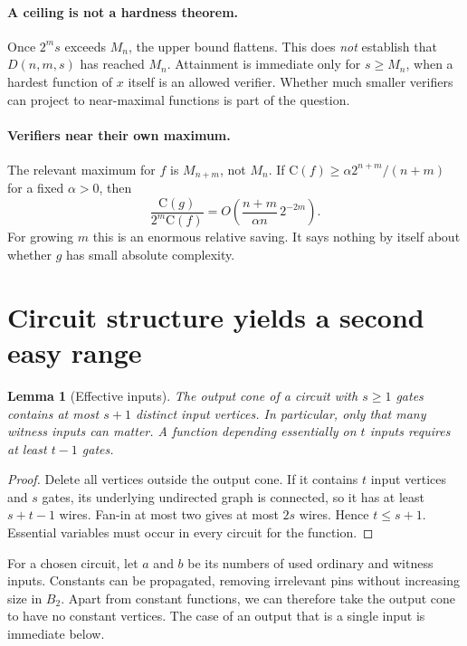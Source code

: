 \documentclass[11pt]{article}
\newtheorem{lemma}[theorem]{Lemma}
\theoremstyle{definition}
\theoremstyle{remark}
\newcommand{\C}{\mathrm{C}}
\begin{document}
\paragraph{A ceiling is not a hardness theorem.}
Once $2^m s$ exceeds $M_n$, the upper bound flattens. This does
\emph{not} establish that $D(n,m,s)$ has reached $M_n$. Attainment is
immediate only for $s\ge M_n$, when a hardest function of $x$ itself
is an allowed verifier. Whether much smaller verifiers can project to
near-maximal functions is part of the question.

\paragraph{Verifiers near their own maximum.}
The relevant maximum for $f$ is $M_{n+m}$, not $M_n$. If
$\C(f)\ge\alpha2^{n+m}/(n+m)$ for a fixed $\alpha>0$, then
\begin{equation}\label{eq:maximum-ratio}
 \frac{\C(g)}{2^m\C(f)}
    =O\!\left(\frac{n+m}{\alpha n}\,2^{-2m}\right).
\end{equation}
For growing $m$ this is an enormous relative saving. It says nothing
by itself about whether $g$ has small absolute complexity.

\section{Circuit structure yields a second easy range}\label{sec:sharing}

\begin{lemma}[Effective inputs]\label{lem:inputs}
The output cone of a circuit with $s\ge1$ gates contains at most $s+1$
distinct input vertices. In particular, only that many witness inputs
can matter. A function depending essentially on $t$ inputs requires
at least $t-1$ gates.
\end{lemma}
\begin{proof}
Delete all vertices outside the output cone. If it contains $t$ input
vertices and $s$ gates, its underlying undirected graph is connected,
so it has at least $s+t-1$ wires. Fan-in at most two gives at most
$2s$ wires. Hence $t\le s+1$. Essential variables must occur in
every circuit for the function.
\end{proof}

For a chosen circuit, let $a$ and $b$ be its numbers of used ordinary
and witness inputs. Constants can be propagated, removing irrelevant
pins without increasing size in $B_2$. Apart from constant functions,
we can therefore take the output cone to have no constant vertices.
The case of an output that is a single input is immediate below.
\end{document}
